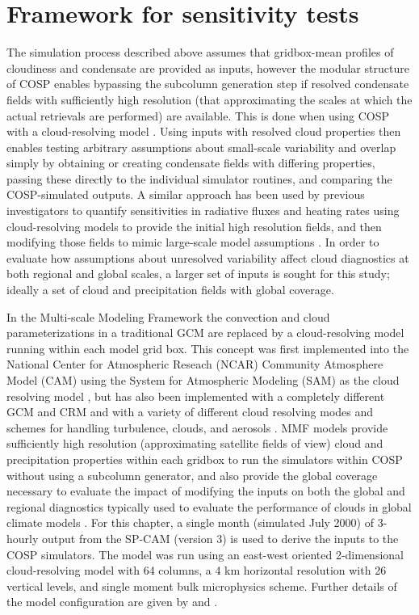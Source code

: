 \section{Framework for sensitivity tests}\label{sec:subgrid1Framework}

The simulation process described above assumes that gridbox-mean
profiles of cloudiness and condensate are provided as inputs, however
the modular structure of COSP enables bypassing the subcolumn generation
step if resolved condensate fields with sufficiently high resolution
(that approximating the scales at which the actual retrievals are
performed) are available. This is done when using COSP with a
cloud-resolving model
\citep[e.g.,][]{marchand_et_al_2009, marchand_and_ackerman_2010}. Using
inputs with resolved cloud properties then enables testing arbitrary
assumptions about small-scale variability and overlap simply by
obtaining or creating condensate fields with differing properties,
passing these directly to the individual simulator routines, and
comparing the COSP-simulated outputs. A similar approach has been used
by previous investigators to quantify sensitivities in radiative fluxes
and heating rates using cloud-resolving models to provide the initial
high resolution fields, and then modifying those fields to mimic
large-scale model assumptions
\citep[e.g.;][]{barker_et_al_1999, wu_and_liang_2005}. In order to
evaluate how assumptions about unresolved variability affect cloud
diagnostics at both regional and global scales, a larger set of inputs
is sought for this study; ideally a set of cloud and precipitation
fields with global coverage.

In the Multi-scale Modeling Framework \citep[MMF;][]{randall_et_al_2003}
the convection and cloud parameterizations in a traditional GCM are
replaced by a cloud-resolving model running within each model grid box.
This concept was first implemented into the National Center for
Atmospheric Reseach (NCAR) Community Atmosphere Model (CAM) using the
System for Atmospheric Modeling (SAM) as the cloud resolving model
\citep[SP-CAM;][]{khairoutdinov_and_randall_2001}, but has also been
implemented with a completely different GCM and CRM
\citep{tao_et_al_2009} and with a variety of different cloud resolving
modes and schemes for handling turbulence, clouds, and aerosols
\citep[e.g.;][]{cheng_and_xu_2011, cheng_and_xu_2013}. MMF models
provide sufficiently high resolution (approximating satellite fields of
view) cloud and precipitation properties within each gridbox to run the
simulators within COSP without using a subcolumn generator, and also
provide the global coverage necessary to evaluate the impact of
modifying the inputs on both the global and regional diagnostics
typically used to evaluate the performance of clouds in global climate
models \citep[e.g.;][]{gleckler_et_al_2008}. For this chapter, a single
month (simulated July 2000) of 3-hourly output from the SP-CAM (version
3) is used to derive the inputs to the COSP simulators. The model was
run using an east-west oriented 2-dimensional cloud-resolving model with
64 columns, a 4 km horizontal resolution with 26 vertical levels, and
single moment bulk microphysics scheme. Further details of the model
configuration are given by \citet{khairoutdinov_et_al_2005} and
\citet{marchand_et_al_2009}.

